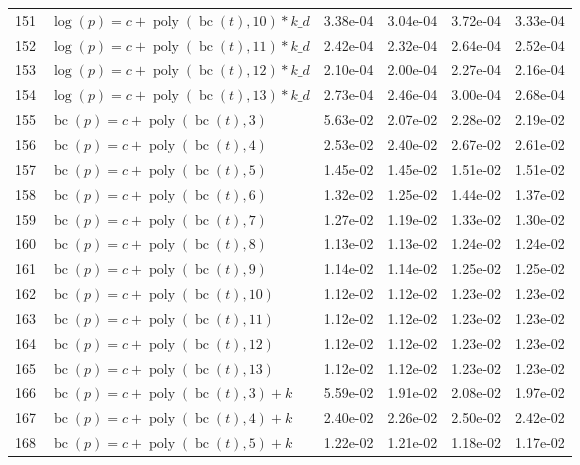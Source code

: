 \documentclass[12pt,a4paper]{article}
\DeclareMathOperator{\bc}{bc}
\DeclareMathOperator{\poly}{poly}
\begin{document}
\begin{longtable}[t]{ll>{\raggedleft\arraybackslash}p{2cm}>{\raggedleft\arraybackslash}p{2cm}>{\raggedleft\arraybackslash}p{2cm}>{\raggedleft\arraybackslash}p{2cm}}
\rowcolor{gray!6}  151 & $\log(p) = c + \poly\left( \bc(t), 10 \right) * k\_d$ & 3.38e-04 & 3.04e-04 & 3.72e-04 & 3.33e-04\\
152 & $\log(p) = c + \poly\left( \bc(t), 11 \right) * k\_d$ & 2.42e-04 & 2.32e-04 & 2.64e-04 & 2.52e-04\\
\rowcolor{gray!6}  153 & $\log(p) = c + \poly\left( \bc(t), 12 \right) * k\_d$ & 2.10e-04 & 2.00e-04 & 2.27e-04 & 2.16e-04\\
154 & $\log(p) = c + \poly\left( \bc(t), 13 \right) * k\_d$ & 2.73e-04 & 2.46e-04 & 3.00e-04 & 2.68e-04\\
\rowcolor{gray!6}  155 & $\bc(p) = c + \poly\left( \bc(t), 3 \right)$ & 5.63e-02 & 2.07e-02 & 2.28e-02 & 2.19e-02\\
156 & $\bc(p) = c + \poly\left( \bc(t), 4 \right)$ & 2.53e-02 & 2.40e-02 & 2.67e-02 & 2.61e-02\\
\rowcolor{gray!6}  157 & $\bc(p) = c + \poly\left( \bc(t), 5 \right)$ & 1.45e-02 & 1.45e-02 & 1.51e-02 & 1.51e-02\\
158 & $\bc(p) = c + \poly\left( \bc(t), 6 \right)$ & 1.32e-02 & 1.25e-02 & 1.44e-02 & 1.37e-02\\
\rowcolor{gray!6}  159 & $\bc(p) = c + \poly\left( \bc(t), 7 \right)$ & 1.27e-02 & 1.19e-02 & 1.33e-02 & 1.30e-02\\
160 & $\bc(p) = c + \poly\left( \bc(t), 8 \right)$ & 1.13e-02 & 1.13e-02 & 1.24e-02 & 1.24e-02\\
\rowcolor{gray!6}  161 & $\bc(p) = c + \poly\left( \bc(t), 9 \right)$ & 1.14e-02 & 1.14e-02 & 1.25e-02 & 1.25e-02\\
162 & $\bc(p) = c + \poly\left( \bc(t), 10 \right)$ & 1.12e-02 & 1.12e-02 & 1.23e-02 & 1.23e-02\\
\rowcolor{gray!6}  163 & $\bc(p) = c + \poly\left( \bc(t), 11 \right)$ & 1.12e-02 & 1.12e-02 & 1.23e-02 & 1.23e-02\\
164 & $\bc(p) = c + \poly\left( \bc(t), 12 \right)$ & 1.12e-02 & 1.12e-02 & 1.23e-02 & 1.23e-02\\
\rowcolor{gray!6}  165 & $\bc(p) = c + \poly\left( \bc(t), 13 \right)$ & 1.12e-02 & 1.12e-02 & 1.23e-02 & 1.23e-02\\
166 & $\bc(p) = c + \poly\left( \bc(t), 3 \right) + k$ & 5.59e-02 & 1.91e-02 & 2.08e-02 & 1.97e-02\\
\rowcolor{gray!6}  167 & $\bc(p) = c + \poly\left( \bc(t), 4 \right) + k$ & 2.40e-02 & 2.26e-02 & 2.50e-02 & 2.42e-02\\
168 & $\bc(p) = c + \poly\left( \bc(t), 5 \right) + k$ & 1.22e-02 & 1.21e-02 & 1.18e-02 & 1.17e-02\\

\end{longtable}
\end{document}
